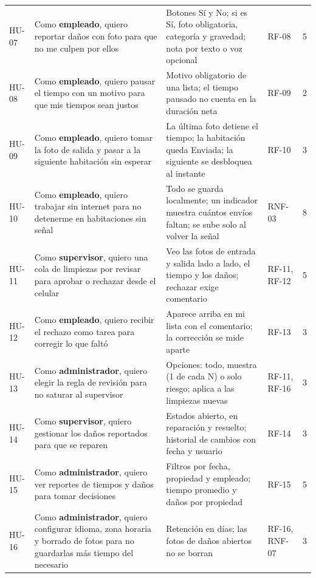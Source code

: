 \documentclass[11pt,a4paper]{article}
\begin{document}
{\begin{longtable}{L{1.1cm} L{5.5cm} L{5.9cm} L{1.4cm} L{0.8cm}}
HU-07 & Como \textbf{empleado}, quiero reportar daños con foto para que no me culpen por ellos & Botones Sí y No; si es Sí, foto obligatoria, categoría y gravedad; nota por texto o voz opcional & RF-08 & 5\\
HU-08 & Como \textbf{empleado}, quiero pausar el tiempo con un motivo para que mis tiempos sean justos & Motivo obligatorio de una lista; el tiempo pausado no cuenta en la duración neta & RF-09 & 2\\
HU-09 & Como \textbf{empleado}, quiero tomar la foto de salida y pasar a la siguiente habitación sin esperar & La última foto detiene el tiempo; la habitación queda Enviada; la siguiente se desbloquea al instante & RF-10 & 3\\
HU-10 & Como \textbf{empleado}, quiero trabajar sin internet para no detenerme en habitaciones sin señal & Todo se guarda localmente; un indicador muestra cuántos envíos faltan; se sube solo al volver la señal & RNF-03 & 8\\
HU-11 & Como \textbf{supervisor}, quiero una cola de limpiezas por revisar para aprobar o rechazar desde el celular & Veo las fotos de entrada y salida lado a lado, el tiempo y los daños; rechazar exige comentario & RF-11, RF-12 & 5\\
HU-12 & Como \textbf{empleado}, quiero recibir el rechazo como tarea para corregir lo que faltó & Aparece arriba en mi lista con el comentario; la corrección se mide aparte & RF-13 & 3\\
HU-13 & Como \textbf{administrador}, quiero elegir la regla de revisión para no saturar al supervisor & Opciones: todo, muestra (1 de cada N) o solo riesgo; aplica a las limpiezas nuevas & RF-11, RF-16 & 3\\
HU-14 & Como \textbf{supervisor}, quiero gestionar los daños reportados para que se reparen & Estados abierto, en reparación y resuelto; historial de cambios con fecha y usuario & RF-14 & 3\\
HU-15 & Como \textbf{administrador}, quiero ver reportes de tiempos y daños para tomar decisiones & Filtros por fecha, propiedad y empleado; tiempo promedio y daños por propiedad & RF-15 & 5\\
HU-16 & Como \textbf{administrador}, quiero configurar idioma, zona horaria y borrado de fotos para no guardarlas más tiempo del necesario & Retención en días; las fotos de daños abiertos no se borran & RF-16, RNF-07 & 3\\
\end{longtable}
}

\end{document}

